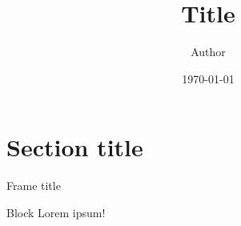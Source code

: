 \documentclass[17pt, t, lualatex]{beamer}
\title{Title}
\date{\today}
\institute[KTH]{KTH Royal Institute of Technology}
\author{Author}
\begin{document}
\inserttitlepage

\section{Section title}

\insertsectionpage

\begin{frame}{Frame title}
\begin{block}{Block}
Lorem ipsum!
\end{block}
\end{frame}

\insertendpage
\end{document}
